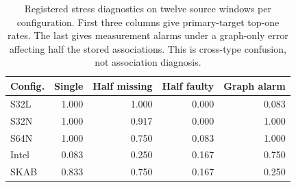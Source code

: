 \begin{table}[t]
\centering
\caption{Registered stress diagnostics on twelve source windows per configuration. First three columns give primary-target top-one rates. The last gives measurement alarms under a graph-only error affecting half the stored associations. This is cross-type confusion, not association diagnosis.}
\label{tab:stress}
\small
\begin{tabular}{lrrrr}
\toprule
Config. & Single & Half missing & Half faulty & Graph alarm \\
\midrule
S32L & 1.000 & 1.000 & 0.000 & 0.083 \\
S32N & 1.000 & 0.917 & 0.000 & 1.000 \\
S64N & 1.000 & 0.750 & 0.083 & 1.000 \\
Intel & 0.083 & 0.250 & 0.167 & 0.750 \\
SKAB & 0.833 & 0.750 & 0.167 & 0.250 \\
\bottomrule
\end{tabular}
\end{table}

